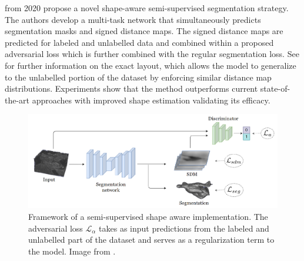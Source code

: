  \cite{DBLP:journals/corr/abs-2007-10732} from 2020 propose a novel shape-aware semi-supervised segmentation strategy. The authors develop a multi-task network that simultaneously predicts segmentation masks and signed distance maps. The signed distance maps are predicted for labeled and unlabelled data and combined within a proposed adversarial loss which is further combined with the regular segmentation loss. See  for further information on the exact layout, which allows the model to generalize to the unlabelled portion of the dataset by enforcing similar distance map distributions. Experiments show that the method outperforms current state-of-the-art approaches with improved shape estimation validating its efficacy.

\begin{figure}[H]%
    \centering
    \includegraphics[width=\imgWidthXL]{images/shape_aware_semi_supervised_method.png}
    \caption[Shape aware semantic segmentation]{Framework of a semi-supervised shape aware implementation. The adversarial loss $\mathcal{L_{\alpha}}$ takes as input predictions from the labeled and unlabelled part of the dataset and serves as a regularization term to the model. Image from \cite{DBLP:journals/corr/abs-2007-10732}.}
    \label{shape_aware_semi_supervised_method}
\end{figure}

